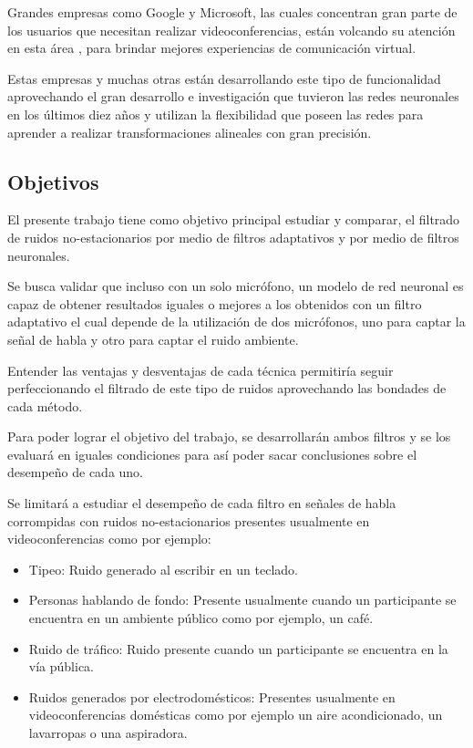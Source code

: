 Grandes empresas como Google y Microsoft, las cuales concentran gran parte de los usuarios que necesitan realizar videoconferencias, están volcando su atención en esta área \cite{interspeech_2020,google_noise_filter}, para brindar mejores experiencias de comunicación virtual.

Estas empresas y muchas otras están desarrollando este tipo de funcionalidad aprovechando el gran desarrollo e investigación que tuvieron las redes neuronales en los últimos diez años y utilizan la flexibilidad que poseen las redes para aprender a realizar transformaciones alineales con gran precisión.

\subsection{Objetivos}
\label{sec:objetivos}

El presente trabajo tiene como objetivo principal estudiar y comparar, el filtrado de ruidos no-estacionarios por medio de filtros adaptativos y por medio de filtros neuronales. 

Se busca validar que incluso con un solo micrófono, un modelo de red neuronal es capaz de obtener resultados iguales o mejores a los obtenidos con un filtro adaptativo el cual depende de la utilización de dos micrófonos, uno para captar la señal de habla y otro para captar el ruido ambiente.

Entender las ventajas y desventajas de cada técnica permitiría seguir perfeccionando el filtrado de este tipo de ruidos aprovechando las bondades de cada método.

Para poder lograr el objetivo del trabajo, se desarrollarán ambos filtros y se los evaluará en iguales condiciones para así poder sacar conclusiones sobre el desempeño de cada uno.

Se limitará a estudiar el desempeño de cada filtro en señales de habla corrompidas con ruidos no-estacionarios presentes usualmente en videoconferencias como por ejemplo:

\begin{itemize}
	\item Tipeo: Ruido generado al escribir en un teclado.
	\item Personas hablando de fondo: Presente usualmente cuando un participante se encuentra en un ambiente público como por ejemplo, un café.
	\item Ruido de tráfico: Ruido presente cuando un participante se encuentra en la vía pública.
	\item Ruidos generados por electrodomésticos: Presentes usualmente en videoconferencias domésticas como por ejemplo un aire acondicionado, un lavarropas o una aspiradora.
\end{itemize}

